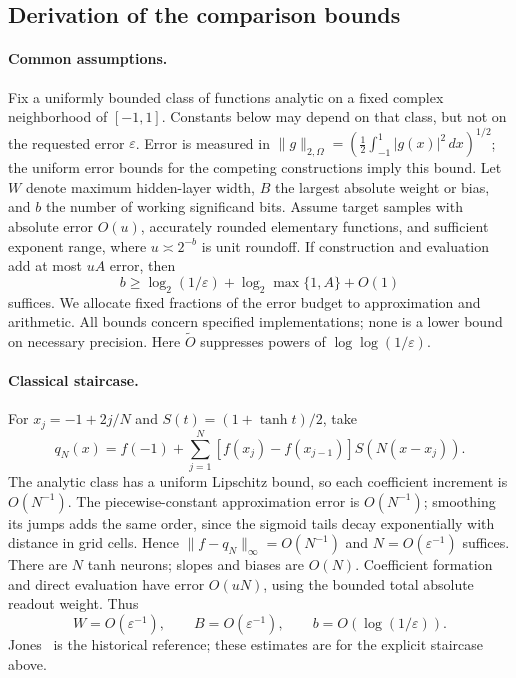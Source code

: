 
\subsection{Derivation of the comparison bounds}
\label{app:comparison-bounds}

\paragraph{Common assumptions.}
Fix a uniformly bounded class of functions analytic on a fixed complex
neighborhood of $[-1,1]$. Constants below may depend on that class, but not
on the requested error $\varepsilon$. Error is measured in
$\|g\|_{2,\Omega}=(\tfrac12\int_{-1}^{1}|g(x)|^2\,dx)^{1/2}$;
the uniform error bounds for the competing constructions imply this bound.
Let $W$ denote maximum hidden-layer width, $B$ the largest absolute weight
or bias, and $b$ the number of working significand bits. Assume target
samples with absolute error $O(u)$, accurately rounded elementary functions,
and sufficient exponent range, where $u\asymp2^{-b}$ is unit roundoff.
If construction and evaluation add at most $uA$ error, then
\begin{equation}
 b\ge\log_2(1/\varepsilon)+\log_2\max\{1,A\}+O(1)
 \label{eq:table-precision}
\end{equation}
suffices. We allocate fixed fractions of the error budget to approximation
and arithmetic. All bounds concern specified implementations; none is a
lower bound on necessary precision. Here $\widetilde O$ suppresses powers
of $\log\log(1/\varepsilon)$.

\paragraph{Classical staircase.}
For $x_j=-1+2j/N$ and $S(t)=(1+\tanh t)/2$, take
\[
 q_N(x)=f(-1)+\sum_{j=1}^{N}
 [f(x_j)-f(x_{j-1})]S(N(x-x_j)).
\]
The analytic class has a uniform Lipschitz bound, so each coefficient
increment is $O(N^{-1})$. The piecewise-constant approximation error is
$O(N^{-1})$; smoothing its jumps adds the same order, since the sigmoid
tails decay exponentially with distance in grid cells. Hence
$\|f-q_N\|_\infty=O(N^{-1})$ and $N=O(\varepsilon^{-1})$ suffices.
There are $N$ tanh neurons; slopes and biases are $O(N)$.
Coefficient formation and direct evaluation have error $O(uN)$, using
the bounded total absolute readout weight. Thus
\[
 W=O(\varepsilon^{-1}),\qquad B=O(\varepsilon^{-1}),\qquad
 b=O(\log(1/\varepsilon)).
\]
Jones~\citeyearpar{58342} is the historical reference; these estimates
are for the explicit staircase above.

